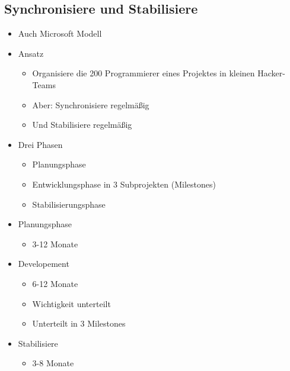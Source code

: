 \subsection{Synchronisiere und Stabilisiere}
\begin{itemize}
    \item Auch \glqq Microsoft Modell\grqq
    \item Ansatz
    \begin{itemize}
        \item Organisiere die 200 Programmierer eines Projektes in \glqq kleinen Hacker-Teams \grqq
        \item Aber: Synchronisiere regelmäßig
        \item Und Stabilisiere regelmäßig
    \end{itemize}
    \item Drei Phasen
    \begin{itemize}
        \item Planungsphase
        \item Entwicklungsphase in 3 Subprojekten (Milestones)
        \item Stabilisierungsphase
    \end{itemize}
\end{itemize}
\begin{itemize}
    \item Planungsphase
    \begin{itemize}
        \item 3-12 Monate
    \end{itemize}
    \item Developement
    \begin{itemize}
        \item 6-12 Monate
        \item Wichtigkeit unterteilt
        \item Unterteilt in 3 Milestones
    \end{itemize}
    \item Stabilisiere
    \begin{itemize}
        \item 3-8 Monate
    \end{itemize}
\end{itemize}
